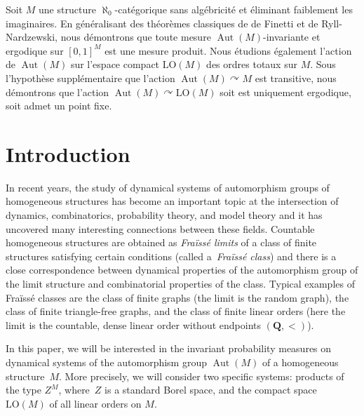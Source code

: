 \documentclass[JEP,XML,SOM,Unicode,published]{cedram}
\theoremstyle{plain}
\theoremstyle{definition}
\newcommand{\Q}{{\mathbf Q}}
\DeclareMathOperator{\Aut}{Aut}
\newcommand{\LO}{\mathrm{LO}}
\begin{document}
\begin{altabstract}
Soit $M$ une structure $\aleph_0$-catégorique sans algébricité et éliminant faiblement les imaginaires. En généralisant des théorèmes classiques de de Finetti et de Ryll-Nardzewski, nous démontrons que toute mesure $\operatorname{Aut}(M)$-invariante et ergodique sur $[0, 1]^M$ est une mesure produit. Nous étudions également l'action de $\operatorname{Aut}(M)$ sur l'espace compact $\mathrm{LO}(M)$ des ordres totaux sur $M$. Sous l'hypothèse supplémentaire que l'action $\operatorname{Aut}(M) \curvearrowright M$ est transitive, nous démontrons que l'action $\operatorname{Aut}(M) \curvearrowright \mathrm{LO}(M)$ soit est uniquement ergodique, soit admet un point fixe.
\end{altabstract}

\maketitle
\vspace*{-\baselineskip}
\tableofcontents
\mainmatter

\section{Introduction}
\label{sec:introduction}

In recent years, the study of dynamical systems of automorphism groups of homo\-ge\-neous structures has become an important topic at the intersection of dynamics, combinatorics, probability theory, and model theory and it has uncovered many \hbox{interesting} connections between these fields. Countable homogeneous structures are obtained as \emph{Fraïssé limits} of a class of finite structures satisfying certain conditions (called a~\emph{Fraïssé class}) and there is a close correspondence between dynamical \hbox{properties} of the automorphism group of the limit structure and combinatorial properties of the class. Typical examples of Fraïssé classes are the class of finite graphs (the limit is the random graph), the class of finite triangle-free graphs, and the class of finite linear orders (here the limit is the countable, dense linear order without endpoints $(\Q, <)$).

In this paper, we will be interested in the invariant probability measures on dynamical systems of the automorphism group $\Aut(M)$ of a homogeneous structure~$M$. More precisely, we will consider two specific systems: products of the type $Z^M$, where~$Z$ is a standard Borel space, and the compact space $\LO(M)$ of all linear orders on $M$.\enlargethispage{.5\baselineskip}%
\end{document}
